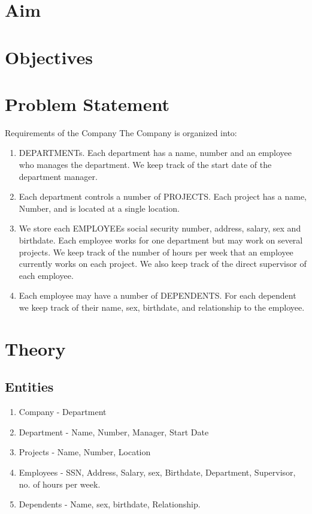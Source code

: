 \documentclass[11pt]{article}
\begin{document}
\tableofcontents
\thispagestyle{empty}
\clearpage

\setcounter{page}{1}

\section{Aim}

\section{Objectives}

\section{Problem Statement}
Requirements of the Company
The Company is organized into: 
\begin{enumerate}
    \item DEPARTMENTs. Each department has a name, number and an employee who manages the department. We keep track of the start date of the department manager. 
    \item Each department controls a number of PROJECTS. Each project has a name, Number, and is located at a single location. 
    \item We store each EMPLOYEEs social security number, address, salary, sex and birthdate. Each employee works for one department but may work on several projects. We keep track of the number of hours per week that an employee currently works on each project. We also keep track of the direct supervisor of each employee. 
    \item Each employee may have a number of DEPENDENTS. For each dependent we keep track of their name, sex, birthdate, and relationship to the employee.
\end{enumerate}

\section{Theory}

\subsection{Entities}
\begin{enumerate}
    \item Company - Department
    \item Department - Name, Number, Manager, Start Date
    \item Projects - Name, Number, Location
    \item Employees - SSN, Address, Salary, sex, Birthdate, Department, Supervisor, no. of hours per week.
    \item Dependents - Name, sex, birthdate, Relationship. 
\end{enumerate}
\end{document}
